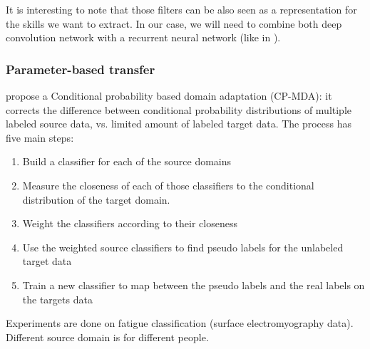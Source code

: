  \par It is interesting to note that those filters can be also seen as a representation for the skills we want to extract. In our case, we will need to combine both deep convolution network with a recurrent neural network (like in \citep{s16010115,pinheiro2014recurrent,huang2016deep}).



  \subsubsection{Parameter-based transfer}
  \citep{chattopadhyay2012multisource} propose a Conditional probability based domain adaptation (CP-MDA): it corrects the difference between conditional probability distributions of multiple labeled source data, vs. limited amount of labeled target data. The process has five main steps:
  \begin{enumerate}
      \item Build a classifier for each of the source domains
      \item Measure the closeness of each of those classifiers to the conditional distribution of the target domain.
      \item Weight the classifiers according to their closeness
      \item Use the weighted source classifiers to find pseudo labels for the unlabeled target data
      \item Train a new classifier to map between the pseudo labels and the real labels on the targets data
  \end{enumerate}
  Experiments are done on fatigue classification (surface electromyography data). Different source domain is for different people.

